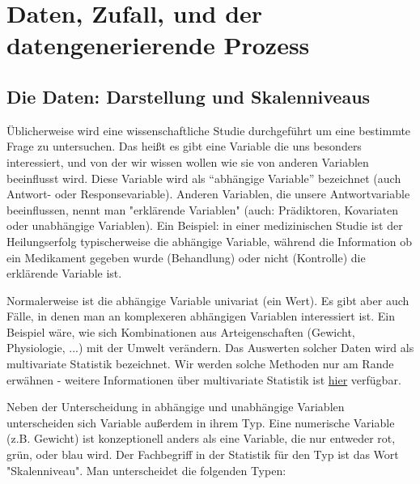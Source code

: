\documentclass[a4paper,twoside]{tufte-book}\usepackage[]{graphicx}\usepackage[]{color}
\begin{document}
	
	\chapter{Daten, Zufall, und der datengenerierende Prozess}
	
		\section{Die Daten: Darstellung und Skalenniveaus}
	
Üblicherweise wird eine wissenschaftliche Studie durchgeführt um eine bestimmte Frage zu untersuchen. Das heißt es gibt eine Variable die uns besonders interessiert, und von der wir wissen wollen wie sie von anderen Variablen beeinflusst wird.   Diese Variable wird als ``abhängige Variable'' bezeichnet (auch Antwort- oder Responsevariable). Anderen Variablen, die unsere Antwortvariable beeinflussen, nennt man "erklärende Variablen" (auch: Prädiktoren, Kovariaten oder unabhängige Variablen). Ein Beispiel: in einer medizinischen Studie ist der Heilungserfolg typischerweise die abhängige Variable, während die Information ob ein Medikament gegeben wurde (Behandlung) oder nicht (Kontrolle) die erklärende Variable ist. 

Normalerweise  ist die abhängige Variable univariat (ein Wert). Es gibt aber auch Fälle, in denen man an komplexeren abhängigen Variablen interessiert ist. Ein Beispiel wäre, wie sich Kombinationen aus Arteigenschaften (Gewicht, Physiologie, ...) mit der Umwelt verändern. Das Auswerten solcher Daten wird als multivariate Statistik bezeichnet. Wir werden solche Methoden nur am Rande erwähnen - weitere Informationen über multivariate Statistik ist \href{http://biometry.github.io/APES/Stats/stats50-MultivariateStatistics.html}{hier} verfügbar.

Neben der Unterscheidung in abhängige und unabhängige Variablen unterscheiden sich Variable außerdem in ihrem Typ. Eine numerische Variable (z.B. Gewicht) ist konzeptionell anders als eine Variable, die nur entweder rot, grün, oder blau wird. Der Fachbegriff in der Statistik für den Typ ist das Wort "Skalenniveau". Man unterscheidet die folgenden Typen:
	
\end{document}
